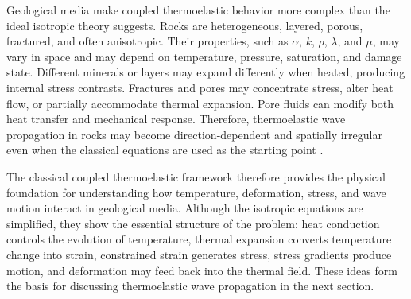 Geological media make coupled thermoelastic behavior more complex than the ideal isotropic theory suggests. Rocks are heterogeneous, layered, porous, fractured, and often anisotropic. Their properties, such as \(\alpha\), \(k\), \(\rho\), \(\lambda\), and \(\mu\), may vary in space and may depend on temperature, pressure, saturation, and damage state. Different minerals or layers may expand differently when heated, producing internal stress contrasts. Fractures and pores may concentrate stress, alter heat flow, or partially accommodate thermal expansion. Pore fluids can modify both heat transfer and mechanical response. Therefore, thermoelastic wave propagation in rocks may become direction-dependent and spatially irregular even when the classical equations are used as the starting point \cite{jaeger2007,mavko2009,robertson1988,turcotte2014}.

The classical coupled thermoelastic framework therefore provides the physical foundation for understanding how temperature, deformation, stress, and wave motion interact in geological media. Although the isotropic equations are simplified, they show the essential structure of the problem: heat conduction controls the evolution of temperature, thermal expansion converts temperature change into strain, constrained strain generates stress, stress gradients produce motion, and deformation may feed back into the thermal field. These ideas form the basis for discussing thermoelastic wave propagation in the next section.